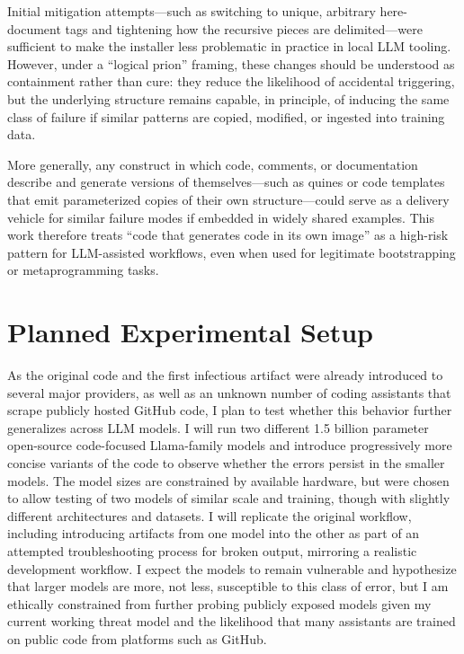 \documentclass[11pt]{article}
\begin{document}
Initial mitigation attempts—such as switching to unique, arbitrary here-document tags and tightening how the recursive pieces are delimited—were sufficient to make the installer less problematic in practice in local LLM tooling. However, under a “logical prion” framing, these changes should be understood as containment rather than cure: they reduce the likelihood of accidental triggering, but the underlying structure remains capable, in principle, of inducing the same class of failure if similar patterns are copied, modified, or ingested into training data.\cite{shumailov2023a,bommasani2024}

More generally, any construct in which code, comments, or documentation describe and generate versions of themselves—such as quines or code templates that emit parameterized copies of their own structure—could serve as a delivery vehicle for similar failure modes if embedded in widely shared examples.\cite{shumailov2023a,owasp2025} This work therefore treats “code that generates code in its own image” as a high-risk pattern for LLM-assisted workflows, even when used for legitimate bootstrapping or metaprogramming tasks.

\section{Planned Experimental Setup}
As the original code and the first infectious artifact were already introduced to several major providers, as well as an unknown number of coding assistants that scrape publicly hosted GitHub code, I plan to test whether this behavior further generalizes across LLM models. I will run two different 1.5 billion parameter open-source code-focused Llama-family models and introduce progressively more concise variants of the code to observe whether the errors persist in the smaller models.\cite{opencoder_15b,qwen25_coder_15b} The model sizes are constrained by available hardware, but were chosen to allow testing of two models of similar scale and training, though with slightly different architectures and datasets.\cite{opencoder_15b,qwen25_coder_15b} I will replicate the original workflow, including introducing artifacts from one model into the other as part of an attempted troubleshooting process for broken output, mirroring a realistic development workflow.\cite{code_assistant_risks,code_eval_leakage} I expect the models to remain vulnerable and hypothesize that larger models are more, not less, susceptible to this class of error, but I am ethically constrained from further probing publicly exposed models given my current working threat model and the likelihood that many assistants are trained on public code from platforms such as GitHub.\cite{code_assistant_risks,ai_model_alteration}
\end{document}
